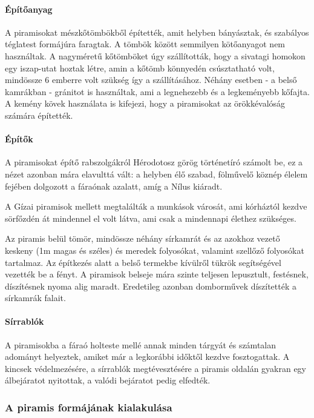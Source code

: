 \paragraph{Építőanyag} A piramisokat mészkőtömbökből építették, amit helyben bányásztak, és szabályos téglatest formájúra faragtak. A tömbök között semmilyen kötőanyagot nem használtak. A nagyméretű kőtömböket úgy szállították, hogy a sivatagi homokon egy iszap-utat hoztak létre, amin a kőtömb könnyedén csúsztatható volt, mindössze 6 emberre volt szükség így a szállításához. Néhány esetben - a belső kamrákban - gránitot is használtak, ami a legnehezebb és a legkeményebb kőfajta. A kemény kövek használata is kifejezi, hogy a piramisokat az örökkévalóság számára építették.

\paragraph{Építők} A piramisokat építő rabszolgákról Hérodotosz görög történetíró számolt be, ez a nézet azonban mára elavulttá vált: a helyben élő szabad, fölművelő köznép élelem fejében dolgozott a fáraónak azalatt, amíg a Nílus kiáradt. 

A Gízai piramisok mellett megtalálták a munkások városát, ami kórháztól kezdve sörfőzdén át mindennel el volt látva, ami csak a mindennapi élethez szükséges. 

Az piramis belül tömör, mindössze néhány sírkamrát és az azokhoz vezető keskeny (1m magas és széles) és meredek folyosókat, valamint szellőző folyosókat tartalmaz. Az építkezés alatt a belső termekbe kívülről tükrök segítségével vezették be a fényt. A piramisok belseje mára szinte teljesen lepusztult, festésnek, díszítésnek nyoma alig maradt. Eredetileg azonban domborművek díszítették a sírkamrák falait.

\paragraph{Sírrablók} A piramisokba a fáraó holteste mellé annak minden tárgyát és számtalan adományt helyeztek, amiket már a legkorábbi időktől kezdve fosztogattak. A kincsek védelmezésére, a sírrablók megtévesztésére a piramis oldalán gyakran egy álbejáratot nyitottak, a valódi bejáratot pedig elfedték.

\subsubsection*{A piramis formájának kialakulása}

